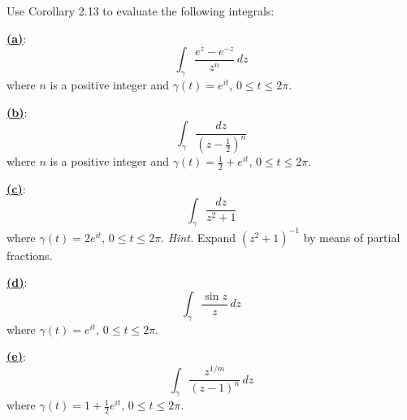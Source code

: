 \documentclass[12pt]{article}
\begin{document}
\begin{homeworkProblem}
  Use Corollary 2.13 to evaluate the following integrals:

  \underline{\textbf{(a)}}:
  \[
    \int_{\gamma} \frac{e^{z} - e^{-z}}{z^n}\,dz
  \]
  where $n$ is a positive integer and $\gamma(t) = e^{it}$, $0 \le t \le 2\pi$.

  \underline{\textbf{(b)}}:
  \[
    \int_{\gamma} \frac{dz}{\left(z - \tfrac{1}{2}\right)^n}
  \]
  where $n$ is a positive integer and $\gamma(t) = \tfrac{1}{2} + e^{it}$, $0 \le t \le 2\pi$.

  \underline{\textbf{(c)}}:
  \[
    \int_{\gamma} \frac{dz}{z^2 + 1}
  \]
  where $\gamma(t) = 2e^{it}$, $0 \le t \le 2\pi$.  
  \textit{Hint.} Expand $(z^2 + 1)^{-1}$ by means of partial fractions.

  \underline{\textbf{(d)}}:
  \[
    \int_{\gamma} \frac{\sin z}{z}\,dz
  \]
  where $\gamma(t) = e^{it}$, $0 \le t \le 2\pi$.

  \underline{\textbf{(e)}}:
  \[
    \int_{\gamma} \frac{z^{1/m}}{(z - 1)^n}\,dz
  \]
  where $\gamma(t) = 1 + \tfrac{1}{2}e^{it}$, $0 \le t \le 2\pi$.
\end{homeworkProblem}
\end{document}
